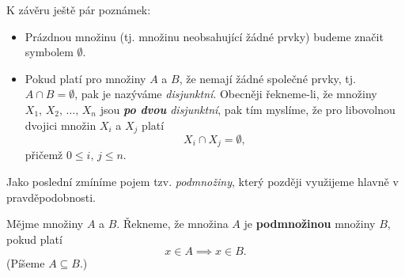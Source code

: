 \begin{remark}
    K závěru ještě pár poznámek:
    \begin{itemize}
        \item Prázdnou množinu (tj. množinu neobsahující žádné prvky) budeme značit symbolem $\emptyset$.
        \item Pokud platí pro množiny $A$ a $B$, že nemají žádné společné prvky, tj. $A \cap B=\emptyset$, pak je nazýváme \emph{disjunktní}. Obecněji řekneme-li, že množiny $X_1,\,X_2,\,\dots,\,X_n$ jsou \emph{\textbf{po dvou} disjunktní}, pak tím myslíme, že pro libovolnou dvojici množin $X_i$ a $X_j$ platí
        \begin{equation*}
            X_i \cap X_j = \emptyset,
        \end{equation*}
        přičemž $0 \leqslant i,\,j \leqslant n$.
    \end{itemize}
\end{remark}

Jako poslední zmíníme pojem tzv. \emph{podmnožiny}, který později využijeme hlavně v pravděpodobnosti.

\begin{definition}[Podmnožina]
    Mějme množiny $A$ a $B$. Řekneme, že množina $A$ je \textbf{podmnožinou} množiny $B$, pokud platí
    \[x\in A\implies x\in B.\]
    (Píšeme $A\subseteq B$.)
\end{definition}